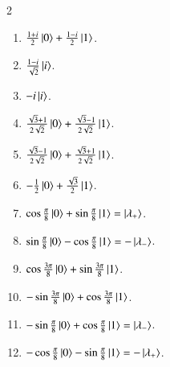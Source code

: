 \begin{solution}
    \begin{multicols}{2}
    \begin{enumerate}[label=(\alph*)]
        \item $\frac{1+i}{2}\left| 0 \right\rangle + \frac{1-i}{2}\left| 1 \right\rangle$.
        \item $\frac{1-i}{\sqrt{2}}\left| i \right\rangle$.
        \item $-i\left| i \right\rangle$.
        \item $\frac{\sqrt{3}+1}{2\sqrt{2}}\left| 0 \right\rangle + \frac{\sqrt{3}-1}{2\sqrt{2}}\left| 1 \right\rangle$.
        \item $\frac{\sqrt{3}-1}{2\sqrt{2}}\left| 0 \right\rangle + \frac{\sqrt{3}+1}{2\sqrt{2}}\left| 1 \right\rangle$.
        \item $-\frac{1}{2}\left| 0 \right\rangle + \frac{\sqrt{3}}{2}\left| 1 \right\rangle$.
        \item $\cos\frac{\pi}{8}\left| 0 \right\rangle + \sin\frac{\pi}{8}\left| 1 \right\rangle=\left| \lambda_+ \right\rangle$.
        \item $\sin\frac{\pi}{8}\left| 0 \right\rangle - \cos\frac{\pi}{8}\left| 1 \right\rangle=-\left| \lambda_- \right\rangle$.
        \item $\cos\frac{3\pi}{8}\left| 0 \right\rangle+\sin\frac{3\pi}{8}\left| 1 \right\rangle$.
        \item $-\sin\frac{3\pi}{8}\left| 0 \right\rangle+\cos\frac{3\pi}{8}\left| 1 \right\rangle$.
        \item $-\sin\frac{\pi}{8}\left| 0 \right\rangle+\cos\frac{\pi}{8}\left| 1 \right\rangle=\left| \lambda_- \right\rangle$.
        \item $-\cos\frac{\pi}{8}\left| 0 \right\rangle-\sin\frac{\pi}{8}\left| 1 \right\rangle=-\left| \lambda_+ \right\rangle$.
    \end{enumerate}
    \end{multicols}
\end{solution}